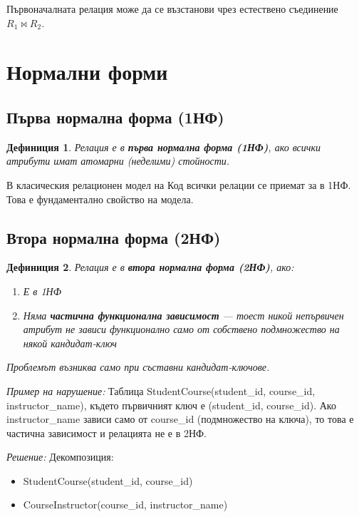 \documentclass{scrartcl}
\newtheorem{definition}{Дефиниция}
\begin{document}
\begin{FlushLeft}
Първоначалната релация може да се възстанови чрез естествено съединение $R_1 \bowtie R_2$.

\section{Нормални форми}

\subsection{Първа нормална форма (1НФ)}

\begin{definition}
Релация е в \textbf{\textit{първа нормална форма (1НФ)}}, ако всички атрибути имат атомарни (неделими) стойности.
\end{definition}

В класическия релационен модел на Код всички релации се приемат за в 1НФ. Това е фундаментално свойство на модела.

\subsection{Втора нормална форма (2НФ)}

\begin{definition}
Релация е в \textbf{\textit{втора нормална форма (2НФ)}}, ако:
\begin{enumerate}
    \item Е в 1НФ
    \item Няма \textbf{\textit{частична функционална зависимост}} --- тоест никой непървичен атрибут не зависи функционално само от собствено подмножество на някой кандидат-ключ
\end{enumerate}

Проблемът възниква само при съставни кандидат-ключове.
\end{definition}

\textit{Пример на нарушение:} Таблица StudentCourse(student\_id, course\_id, instructor\_name), където първичният ключ е (student\_id, course\_id). Ако instructor\_name зависи само от course\_id (подмножество на ключа), то това е частична зависимост и релацията не е в 2НФ.

\textit{Решение:} Декомпозиция:
\begin{itemize}
    \item StudentCourse(student\_id, course\_id)
    \item CourseInstructor(course\_id, instructor\_name)
\end{itemize}


\end{FlushLeft}
\end{document}
